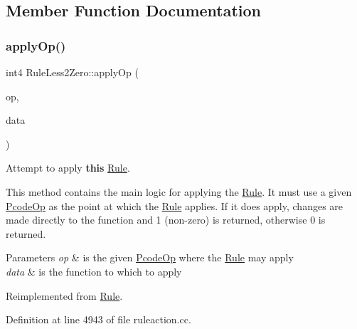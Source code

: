 \subsection{Member Function Documentation}
\mbox{\label{class_rule_less2_zero_ac9d89e7b8899c76a40f88b3b0a5a0d74}} 
\subsubsection{\texorpdfstring{applyOp()}{applyOp()}}
{\footnotesize\ttfamily int4 Rule\+Less2\+Zero\+::apply\+Op (\begin{DoxyParamCaption}\item[{\mbox{\hyperlink{class_pcode_op}{Pcode\+Op}} $\ast$}]{op,  }\item[{\mbox{\hyperlink{class_funcdata}{Funcdata}} \&}]{data }\end{DoxyParamCaption})\hspace{0.3cm}{\ttfamily [virtual]}}



Attempt to apply {\bfseries{this}} \mbox{\hyperlink{class_rule}{Rule}}. 

This method contains the main logic for applying the \mbox{\hyperlink{class_rule}{Rule}}. It must use a given \mbox{\hyperlink{class_pcode_op}{Pcode\+Op}} as the point at which the \mbox{\hyperlink{class_rule}{Rule}} applies. If it does apply, changes are made directly to the function and 1 (non-\/zero) is returned, otherwise 0 is returned. 
\begin{DoxyParams}{Parameters}
{\em op} & is the given \mbox{\hyperlink{class_pcode_op}{Pcode\+Op}} where the \mbox{\hyperlink{class_rule}{Rule}} may apply \\
\hline
{\em data} & is the function to which to apply \\
\hline
\end{DoxyParams}


Reimplemented from \mbox{\hyperlink{class_rule_a4e3e61f066670175009f60fb9dc60848}{Rule}}.



Definition at line 4943 of file ruleaction.\+cc.

